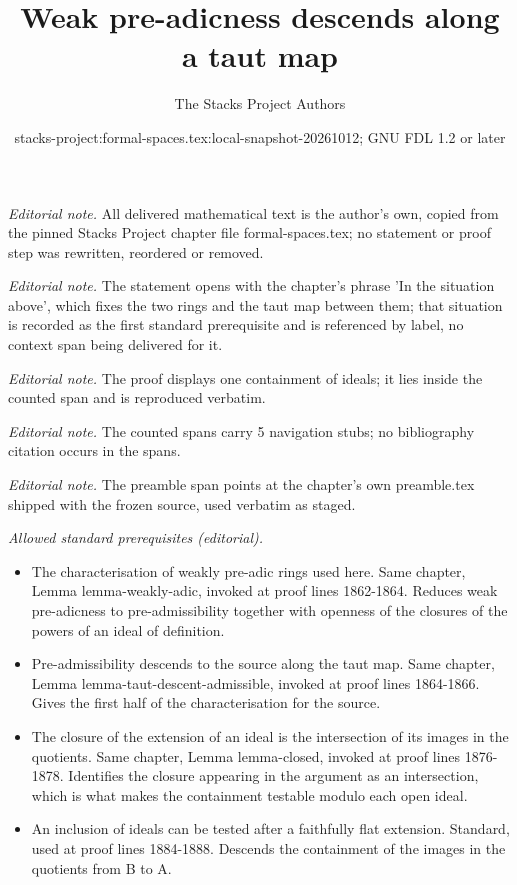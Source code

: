 \documentclass{stacks-project}
\title{Weak pre-adicness descends along a taut map}
\author{The Stacks Project Authors}
\date{stacks-project:formal-spaces.tex:local-snapshot-20261012; GNU FDL 1.2 or later}
\theoremstyle{plain}
\theoremstyle{definition}
\theoremstyle{remark}
\numberwithin{equation}{subsection}
\begin{document}
\maketitle
\noindent\textit{Editorial note.} All delivered mathematical text is the author's own, copied from the pinned Stacks Project chapter file formal-spaces.tex; no statement or proof step was rewritten, reordered or removed.\par\medskip
\noindent\textit{Editorial note.} The statement opens with the chapter's phrase 'In the situation above', which fixes the two rings and the taut map between them; that situation is recorded as the first standard prerequisite and is referenced by label, no context span being delivered for it.\par\medskip
\noindent\textit{Editorial note.} The proof displays one containment of ideals; it lies inside the counted span and is reproduced verbatim.\par\medskip
\noindent\textit{Editorial note.} The counted spans carry 5 navigation stubs; no bibliography citation occurs in the spans.\par\medskip
\noindent\textit{Editorial note.} The preamble span points at the chapter's own preamble.tex shipped with the frozen source, used verbatim as staged.\par\medskip
\noindent\textit{Allowed standard prerequisites (editorial).}\begin{itemize}
\item The characterisation of weakly pre-adic rings used here. Same chapter, Lemma lemma-weakly-adic, invoked at proof lines 1862-1864. Reduces weak pre-adicness to pre-admissibility together with openness of the closures of the powers of an ideal of definition.
\item Pre-admissibility descends to the source along the taut map. Same chapter, Lemma lemma-taut-descent-admissible, invoked at proof lines 1864-1866. Gives the first half of the characterisation for the source.
\item The closure of the extension of an ideal is the intersection of its images in the quotients. Same chapter, Lemma lemma-closed, invoked at proof lines 1876-1878. Identifies the closure appearing in the argument as an intersection, which is what makes the containment testable modulo each open ideal.
\item An inclusion of ideals can be tested after a faithfully flat extension. Standard, used at proof lines 1884-1888. Descends the containment of the images in the quotients from B to A.
\end{itemize}\medskip
\end{document}
